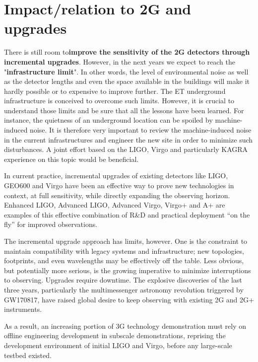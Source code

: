 \section{Impact/relation to 2G and upgrades}

There is still room to\textbf{improve the sensitivity of the 2G detectors through incremental upgrades}. However, in the next years we expect to reach the "\textbf{infrastructure limit}". In other words, the level of environmental noise as well as the detector lengths and even the space available in the buildings will make it hardly possible or to expensive to improve further. The ET underground infrastructure is conceived to overcome such limits.  However, it is crucial to understand those limits and be sure that all the lessons have been learned. For instance, the quietness of an underground location can be spoiled by machine-induced noise. It is therefore very important to review the machine-induced noise in the current infrastructures and engineer the new site in order to minimize such disturbances. A joint effort based on the LIGO, Virgo and particularly KAGRA experience on this topic would be beneficial. 

In current practice, incremental upgrades of existing detectors like LIGO, GEO600  and Virgo have been an effective way to prove new technologies in context, at full sensitivity, while directly expanding the observing horizon. Enhanced LIGO, Advanced LIGO, Advanced Virgo, Virgo+ and A+ are examples of this effective combination of R\&D and practical deployment ``on the fly''  for improved observations.  

The incremental upgrade approach has limits, however.  One is the constraint to maintain compatibility with legacy systems and infrastructure; new topologies, footprints, and even wavelengths may be effectively off the table. Less obvious, but potentially more serious, is the growing imperative to minimize interruptions to observing. Upgrades require downtime.  The explosive discoveries of the last three years, particularly the multimessenger astronomy revolution triggered by GW170817,  have raised global desire to keep observing with existing 2G and 2G+ instruments. 

As a result, an increasing portion of 3G technology demonstration must rely on offline engineering development in subscale demonstrations, reprising the  development environment of initial LIGO and Virgo, before any large-scale testbed existed. 

